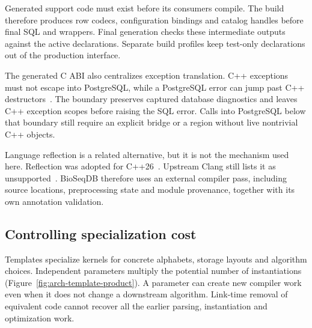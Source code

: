 Generated support code must exist before its consumers compile. The build
therefore produces row codecs, configuration bindings and catalog handles
before final SQL and wrappers. Final generation checks these intermediate
outputs against the active declarations. Separate build profiles keep
test-only declarations out of the production interface.

The generated C ABI also centralizes exception translation. C++ exceptions
must not escape into PostgreSQL, while a PostgreSQL error can jump past C++
destructors~\autocite{postgresql17_cpp_extensibility}. The boundary preserves captured
database diagnostics and leaves C++ exception scopes before raising the SQL
error. Calls into PostgreSQL below that boundary still require an explicit
bridge or a region without live nontrivial C++ objects.

Language reflection is a related alternative, but it is not the mechanism
used here. Reflection was adopted for C++26~\autocite{wg21_n5015_reflection}.
Upstream Clang still lists it as unsupported~\autocite{clang_cxx_status}. BioSeqDB
therefore uses an external compiler pass, including source locations,
preprocessing state and module provenance, together with its own annotation
validation.

\subsection{Controlling specialization cost}
\label{sec:arch-specialization-cost}

Templates specialize kernels for concrete alphabets, storage layouts and
algorithm choices. Independent parameters multiply the potential number of
instantiations (Figure~\ref{fig:arch-template-product}). A parameter can create
new compiler work even when it does not change a downstream algorithm.
Link-time removal of equivalent code cannot recover all the earlier parsing,
instantiation and optimization work.

